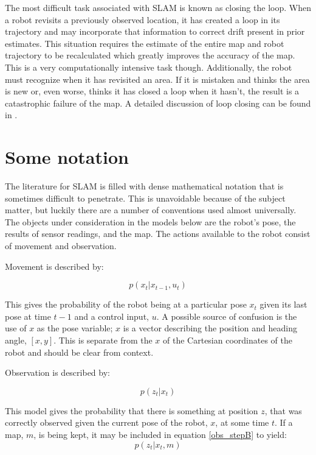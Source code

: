 The most difficult task associated with SLAM is known as closing the loop.  When a robot revisits a previously observed location, it has created a loop in its trajectory and may incorporate that information to correct drift present in prior estimates.  This situation requires the estimate of the entire map and robot trajectory to be recalculated which greatly improves the accuracy of the map.  This is a very computationally intensive task though.  Additionally, the robot must recognize when it has revisited an area.  If it is mistaken and thinks the area is new or, even worse, thinks it has closed a loop when it hasn’t, the result is a catastrophic failure of the map.  A detailed discussion of loop closing can be found in \cite{LoopClosing}.

\section{Some notation}

The literature for SLAM is filled with dense mathematical notation that is sometimes difficult to penetrate.  This is unavoidable because of the subject matter, but luckily there are a number of conventions used almost universally.  The objects under consideration in the models below are the robot’s pose, the results of sensor readings, and the map.  The actions available to the robot consist of movement and observation.  

Movement is described by:

\begin{equation}\label{predict_stepB}
p(x_{t}|x_{t-1},u_{t})
\end{equation}

This gives the probability of the robot being at a particular pose $x_{t}$ given its last pose at time $t-1$ and a control input, $u$.  A possible source of confusion is the use of $x$ as the pose variable;  $x$ is a vector describing the position and heading angle, $[x,y]$. This is separate from the $x$ of the Cartesian coordinates of the robot and should be clear from context.  

Observation is described by:

\begin{equation}\label{obs_stepB}
p(z_{t}|x_{t})
\end{equation}
   
This model gives the probability that there is something at position $z$, that was correctly observed given the current pose of the robot, $x$, at some time $t$.  If a map, $m$, is being kept, it may be included in equation \ref{obs_stepB} to yield:
\begin{equation}\label{obs_step_mapB}
p(z_{t}|x_{t},m)
\end{equation}


